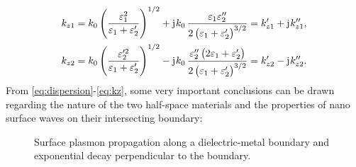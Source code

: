 \documentclass[11pt]{article}
\begin{document}
\begin{subequations}
  \begin{align}
    k_{z1} = k_0 \left( \frac{\varepsilon_1^2}{\varepsilon_1 + \varepsilon_2'} \right)^{1/2} + \mathrm{j}\mkern1mu k_0 \,  \frac{ \varepsilon_1 \varepsilon_2''}{2 \left( \varepsilon_1 + \varepsilon_2' \right)^{3/2}} = k_{z1}' + \mathrm{j}\mkern1mu k_{z1}'',
    \label{eq:kz1} \\
    k_{z2} = k_0 \left( \frac{\varepsilon_2'^2}{\varepsilon_1 + \varepsilon_2'} \right)^{1/2} - \mathrm{j}\mkern1mu k_0 \, \frac{\varepsilon_2''\left( 2\varepsilon_1 + \varepsilon_2' \right) }{2 \left( \varepsilon_1 + \varepsilon_2' \right)^{3/2}} = k_{z2}' - \mathrm{j}\mkern1mu k_{z2}''.
    \label{eq:kz2}
  \end{align}
  \label{eq:kz}%
\end{subequations}
%
From \eqref{eq:dispersion}-\eqref{eq:kz}, some very important conclusions can be drawn regarding the nature of the two half-space materials and the properties of nano surface waves on their intersecting boundary:
%
\begin{figure}[b!]
  \centering
  \def\svgwidth{.75\linewidth}
  
  \caption{Surface plasmon propagation along a dielectric-metal boundary and exponential decay perpendicular to the boundary.}
  \label{fig:spp}
\end{figure}
%
\end{document}
